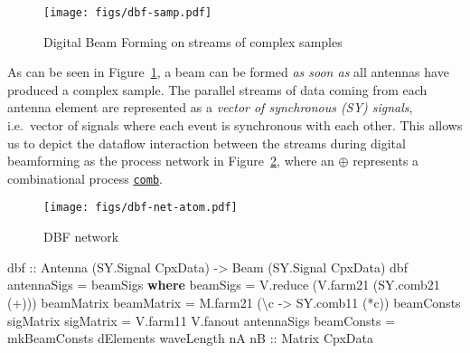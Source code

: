 \documentclass[
  a4paper,
]{article}
\newenvironment{Shaded}{}{}
\newcommand{\DataTypeTok}[1]{\textcolor[rgb]{0.56,0.13,0.00}{#1}}
\newcommand{\FunctionTok}[1]{\textcolor[rgb]{0.02,0.16,0.49}{#1}}
\newcommand{\KeywordTok}[1]{\textcolor[rgb]{0.00,0.44,0.13}{\textbf{#1}}}
\newcommand{\NormalTok}[1]{#1}
\newcommand{\OtherTok}[1]{\textcolor[rgb]{0.00,0.44,0.13}{#1}}
\begin{document}
\suppressfloats

\begin{figure}
\hypertarget{fig:dbf-samp}{%
\centering
\texttt{[image: figs/dbf-samp.pdf]}
\caption{Digital Beam Forming on streams of complex
samples}\label{fig:dbf-samp}
}
\end{figure}

As can be seen in Figure~\ref{fig:dbf-samp}, a beam can be formed
\emph{as soon as} all antennas have produced a complex sample. The
parallel streams of data coming from each antenna element are
represented as a \emph{vector of synchronous (SY) signals}, i.e.~vector
of signals where each event is synchronous with each other. This allows
us to depict the dataflow interaction between the streams during digital
beamforming as the process network in Figure~\ref{fig:dbf-net-atom},
where an \(\oplus\) represents a combinational process
\href{https://forsyde.github.io/forsyde-atom/api/ForSyDe-Atom-MoC.html\#v:comb22}{\texttt{comb}}.

\suppressfloats

\begin{figure}
\hypertarget{fig:dbf-net-atom}{%
\centering
\texttt{[image: figs/dbf-net-atom.pdf]}
\caption{DBF network}\label{fig:dbf-net-atom}
}
\end{figure}

\begin{Shaded}
\begin{Highlighting}[numbers=left,,firstnumber=157,]
\OtherTok{dbf ::} \DataTypeTok{Antenna}\NormalTok{ (}\DataTypeTok{SY.Signal} \DataTypeTok{CpxData}\NormalTok{)}
    \OtherTok{->} \DataTypeTok{Beam}\NormalTok{    (}\DataTypeTok{SY.Signal} \DataTypeTok{CpxData}\NormalTok{)}
\NormalTok{dbf antennaSigs }\FunctionTok{=}\NormalTok{ beamSigs}
  \KeywordTok{where}
\NormalTok{    beamSigs   }\FunctionTok{=}\NormalTok{ V.reduce (V.farm21 (SY.comb21 (}\FunctionTok{+}\NormalTok{))) beamMatrix}
\NormalTok{    beamMatrix }\FunctionTok{=}\NormalTok{ M.farm21 (\textbackslash{}c }\OtherTok{->}\NormalTok{ SY.comb11 (}\FunctionTok{*}\NormalTok{c)) beamConsts sigMatrix}
\NormalTok{    sigMatrix  }\FunctionTok{=}\NormalTok{ V.farm11 V.fanout antennaSigs}
\NormalTok{    beamConsts }\FunctionTok{=}\NormalTok{ mkBeamConsts dElements waveLength nA}\OtherTok{ nB ::} \DataTypeTok{Matrix} \DataTypeTok{CpxData}
\end{Highlighting}
\end{Shaded}
\end{document}
